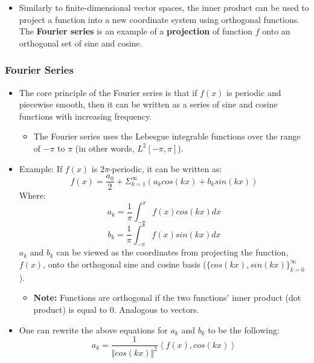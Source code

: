 \documentclass[11.5pt,a4paper]{article}
\begin{document}
\begin{itemize}
    \item Similarly to finite-dimensional vector spaces, the inner product can be used to project a function into a new coordinate system using orthogonal functions. The \textbf{Fourier series} is an example of a \textbf{projection} of function $f$ onto an orthogonal set of sine and cosine.
\end{itemize}

\subsubsection*{Fourier Series}

\begin{itemize}
    \item The core principle of the Fourier series is that if $f(x)$ is periodic and piecewise smooth, then it can be written as a series of sine and cosine functions with increasing frequency.
    \begin{itemize}
        \item The Fourier series uses the Lebesgue integrable functions over the range of $-\pi$ to $\pi$ (in other words, $L^2[-\pi, \pi]$). 
    \end{itemize}
    \item Example: If $f(x)$ is $2\pi$-periodic, it can be written as:
    \begin{equation*}
        f(x) = \frac{a_0}{2} + \Sigma^\infty_{k=1} (a_kcos(kx)+ b_ksin(kx))
    \end{equation*}
    Where:
    \begin{equation*}
        a_k = \frac{1}{\pi}\int^\pi_{-\pi}f(x)cos(kx) dx
    \end{equation*}
    \begin{equation*}
        b_k = \frac{1}{\pi}\int^\pi_{-\pi}f(x)sin(kx) dx
    \end{equation*}
    $a_k$ and $b_k$ can be viewed as the coordinates from projecting the function, $f(x)$, onto the orthogonal sine and cosine basis ($\{cos(kx), sin(kx)\}^\infty_{k=0}$).
    \begin{itemize}
        \item \textbf{Note:} Functions are orthogonal if the two functions' inner product (dot product) is equal to 0. Analogous to vectors.
    \end{itemize}
    \item One can rewrite the above equations for $a_k$ and $b_k$ to be the following:
    \begin{equation*}
        a_k = \frac{1}{\Vert cos(kx) \Vert^2}\left<f(x), cos(kx)\right>

\end{equation*}
\end{itemize}
\end{document}
